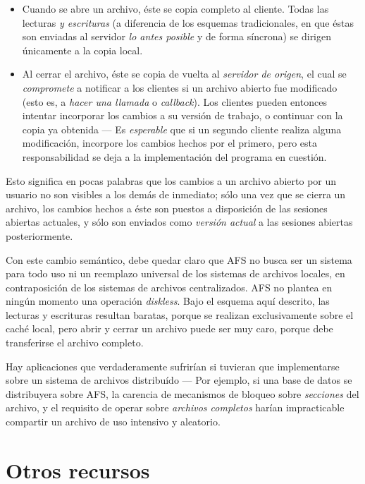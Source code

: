 \documentclass[11pt,fleqn]{book} %
\begin{document}
\begin{itemize}
\item Cuando se abre un archivo, éste se copia completo al cliente. Todas
  las lecturas \emph{y escrituras} (a diferencia de los esquemas
  tradicionales, en que éstas son enviadas al servidor \emph{lo antes   posible} y de forma síncrona) se dirigen únicamente a la copia
  local.
\item Al cerrar el archivo, éste se copia de vuelta al \emph{servidor de   origen}, el cual se \emph{compromete} a notificar a los clientes si un
  archivo abierto fue modificado (esto es, a \emph{hacer una llamada} o
  \emph{callback}). Los clientes pueden entonces intentar incorporar los
  cambios a su versión de trabajo, o continuar con la copia ya
  obtenida — Es \emph{esperable} que si un segundo cliente realiza alguna
  modificación, incorpore los cambios hechos por el primero, pero esta
  responsabilidad se deja a la implementación del programa en
  cuestión.
\end{itemize}

Esto significa en pocas palabras que los cambios a un archivo abierto
por un usuario no son visibles a los demás de inmediato; sólo una vez
que se cierra un archivo, los cambios hechos a éste son puestos a
disposición de las sesiones abiertas actuales, y sólo son enviados
como \emph{versión actual} a las sesiones abiertas posteriormente.

Con este cambio semántico, debe quedar claro que AFS no busca ser un
sistema para todo uso ni un reemplazo universal de los sistemas de
archivos locales, en contraposición de los sistemas de archivos
centralizados. AFS no plantea en ningún momento una operación
\emph{diskless}. Bajo el esquema aquí descrito, las lecturas y escrituras
resultan baratas, porque se realizan exclusivamente sobre el caché
local, pero abrir y cerrar un archivo puede ser muy caro, porque debe
transferirse el archivo completo.

Hay aplicaciones que verdaderamente sufrirían si
tuvieran que implementarse sobre un sistema de archivos distribuído —
Por ejemplo, si una base de datos se distribuyera sobre AFS, la
carencia de mecanismos de bloqueo sobre \emph{secciones} del archivo, y el
requisito de operar sobre \emph{archivos completos} harían impracticable
compartir un archivo de uso intensivo y aleatorio.
\section{Otros recursos}
\label{sec-6-5}
\end{document}
